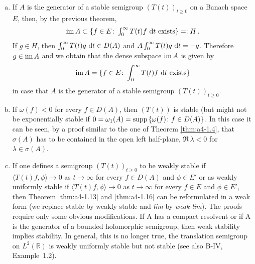 \begin{remark}\label{rem:a4-1.17}
\begin{enumerate}[(a), wide, labelsep=1em]
\item 
If $A$ is the generator of a stable semigroup
$(T(t))_{t \geq 0}$ on a Banach space $E$, then, by the previous theorem,
\[\textstyle{
\mathop{}\!\mathrm{im}\,A \subset \{f \in E\colon\int_{0}^{\infty} T(t)f \,\mathop{}\!\mathrm{d}{t}\text{ exists}\} =: H\,.
}\]
If $g \in H$, then $\int_{0}^{\infty} T(t)g \,\mathop{}\!\mathrm{d}{t} \in D(A)$ and $A \int_{0}^{\infty} T(t)g \,\mathop{}\!\mathrm{d}{t} = -g$. 
Therefore $g \in \mathop{}\!\mathrm{im}\, A$ and we obtain that the dense subspace $\mathop{}\!\mathrm{im}\, A$ is given
by
\begin{equation}\label{eq:a4-1.14}
\mathop{}\!\mathrm{im}\, A = \{f \in E\colon\int_{0}^{\infty} T(t)f \,\mathop{}\!\mathrm{d}{t} \text{ exists}\}
\end{equation}
in case that $A$ is the generator of a stable semigroup $(T(t))_{t \geq 0}$.


\item 
If $\omega(f) < 0$ for every $f \in D(A)$, then $(T(t))$ is stable (but
might not be exponentially stable if
$0 = \omega_{1}(A) = \mathop{}\!\mathrm{supp}\,\{\omega(f) \colon f \in D(A)\}$. 
In this case it can be seen, by a
proof similar to the one of Theorem \ref{thm:a4-1.4}, that $\sigma(A)$ has to be contained
in the open left half-plane, \ie $\Re\,\lambda < 0$ for $\lambda \in \sigma(A)$.

\item 
If one defines a semigroup $(T(t))_{t \geq 0}$ to be weakly stable if
$\langle T(t)f,\phi \rangle \to 0$ as $t \to \infty$ for every $f \in D(A)$ and $\phi \in E'$ or as
weakly uniformly stable if $\langle T(t)f,\phi \rangle \to 0$ as $t \to \infty$ for every $f \in E$
and $\phi \in E'$, then Theorem \ref{thm:a4-1.13} and \ref{thm:a4-1.16} can be reformulated in a weak form (\ie we replace stable by weakly stable and \emph{lim} by
\emph{weak-lim}). 
The proofs require only some obvious modifications.
If A has a compact resolvent or if A is the generator of a bounded
holomorphic semigroup, then weak stability implies stability. 
In general, this is no longer true, \eg the translation semigroup on
$L^{2}(\mathbb{R})$ is weakly uniformly stable but not stable (see also
B-IV, Example~1.2).
\end{enumerate}
\end{remark}

